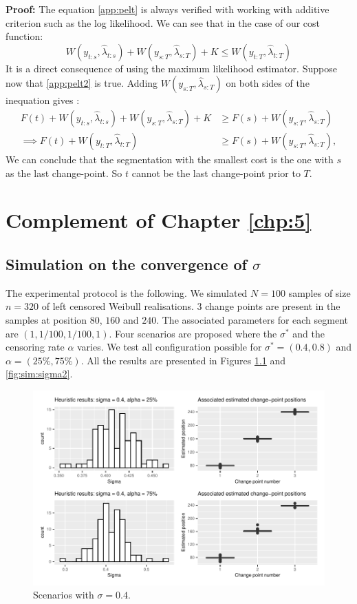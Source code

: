 \begin{appendices}
\textbf{Proof:} The equation \ref{app:pelt} is always verified with working with additive criterion such as the log likelihood. We can see that in the case of our cost function: 
$$W(y_{t:s},\hat\lambda_{t:s})+W(y_{s:T},\hat\lambda_{s:T})+K\leq W(y_{t:T},\hat\lambda_{t:T})$$
It is a direct consequence of using the maximum likelihood estimator. Suppose now that \ref{app:pelt2} is true. Adding $W(y_{s:T},\hat\lambda_{s:T})$ on both sides of the inequation gives : 
\begin{align*}
  F(t)+W(y_{t:s},\hat\lambda_{t:s})+W(y_{s:T},\hat\lambda_{s:T})+K &\geq F(s)+W(y_{s:T},\hat\lambda_{s:T}) \\
  \implies F(t)+W(y_{t:T},\hat\lambda_{t:T}) &\geq F(s)+W(y_{s:T},\hat\lambda_{s:T}),
\end{align*}
We can conclude that the segmentation with the smallest cost is the one with $s$ as the last change-point. So $t$ cannot be the last change-point prior to $T$.

\chapter{Complement of Chapter \ref{chp:5}}\label{annex:chap:5}

\section{Simulation on the convergence of \texorpdfstring{$\sigma$}{s}} \label{app:sim:chap5}

The experimental protocol is the following. We simulated $N = 100$ samples of size $n = 320$ of left censored Weibull realisations. 3 change points are present in the samples at position $80$, $160$ and $240$. The associated parameters for each segment are $(1,1/100,1/100,1)$. Four scenarios are proposed where the $\sigma^*$ and the censoring rate $\alpha$ varies. We test all configuration possible for $\sigma^* = (0.4,0.8)$ and $\alpha = (25\%,75\%)$. All the results are presented in Figures \ref{fig:sim:sigma1} and \ref{fig:sim:sigma2}.     

\begin{figure}[ht]
    \centering
    \includegraphics{figs/App/SIM_CHAP5_1.pdf}
    \caption{Scenarios with $\sigma = 0.4$.}
    \label{fig:sim:sigma1}
\end{figure}


\end{appendices}
